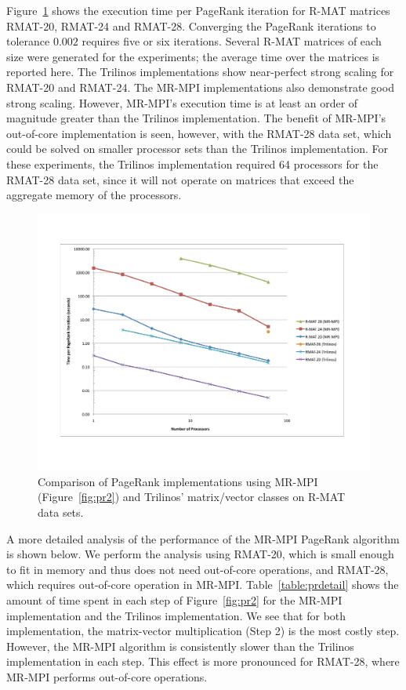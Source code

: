 Figure~\ref{f:pr} shows the execution time per PageRank iteration for
R-MAT matrices RMAT-20, RMAT-24 and RMAT-28.  Converging the PageRank
iterations to tolerance $0.002$ requires five or six iterations.
Several R-MAT matrices of each size were generated for the
experiments; the average time over the matrices is reported here.  The
Trilinos implementations show near-perfect strong scaling for RMAT-20
and RMAT-24.  The MR-MPI implementations also demonstrate good strong
scaling.  However, MR-MPI's execution time is at least an order of
magnitude greater than the Trilinos implementation.  
The benefit of MR-MPI's out-of-core implementation
is seen, however, with the RMAT-28 data set, which could be solved on
smaller processor sets than the Trilinos implementation.  For these
experiments, the Trilinos implementation required 64 processors for
the RMAT-28 data set, since it will not operate on matrices that
exceed the aggregate memory of the processors.

\begin{figure}[htb]
\includegraphics[width=\textwidth]{fig_pagerank.pdf}
\caption{Comparison of PageRank implementations using 
MR-MPI (Figure~\ref{fig:pr2}) and 
Trilinos' matrix/vector classes on R-MAT data sets.}
\label{f:pr}
\end{figure}


A more detailed analysis of the performance of the MR-MPI PageRank 
algorithm is shown
below.  We perform the analysis using RMAT-20, which is small enough to
fit in memory and thus does not need out-of-core operations, and RMAT-28,
which requires out-of-core operation in MR-MPI.  Table~\ref{table:prdetail}
shows the amount of time spent in each step of Figure~\ref{fig:pr2} for 
the MR-MPI implementation and the Trilinos implementation.  We see that for
both implementation, the matrix-vector multiplication (Step 2) is the most
costly step.  However, the MR-MPI algorithm is consistently slower than
the Trilinos implementation in each step.  This effect is more pronounced
for RMAT-28, where MR-MPI performs out-of-core operations.

